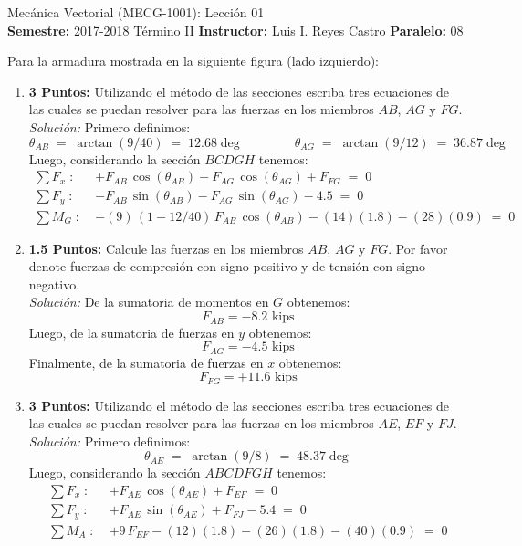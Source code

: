 \documentclass[ a4paper, twoside, 11pt]{article}
\newcommand{\numero}{01}
\begin{document}
\allowdisplaybreaks

\begin{center}
\Large Mec\'anica Vectorial (MECG-1001): Lecci\'on \numero \\[2ex]
\small \textbf{Semestre:} 2017-2018 T\'ermino II \qquad
\textbf{Instructor:} Luis I. Reyes Castro \qquad
\textbf{Paralelo:} 08
\end{center}
\fullskip

\begin{problem}
Para la armadura mostrada en la siguiente figura (lado izquierdo):
\begin{enumerate}[label=\textbf{\alph*)}]
\item \textbf{3 Puntos:} Utilizando el m\'etodo de las secciones escriba tres ecuaciones de las cuales se puedan resolver para las fuerzas en los miembros $AB$, $AG$ y $FG$. \\[1ex] \emph{Soluci\'on:} Primero definimos: 
\[
\theta_{AB} \; = \; \arctan( 9 / 40 ) \; = \; 12.68\deg \qquad \qquad
\theta_{AG} \; = \; \arctan( 9 / 12 ) \; = \; 36.87\deg
\]
Luego, considerando la secci\'on $BCDGH$ tenemos: 
\begin{align*}
\sum F_x \; \colon \;
& +F_{AB} \, \cos(\theta_{AB}) + F_{AG} \, \cos(\theta_{AG}) + F_{FG} \; = \; 0 \\[1ex]
\sum F_y \; \colon \;
& -F_{AB} \, \sin(\theta_{AB}) - F_{AG} \, \sin(\theta_{AG}) - 4.5 \; = \; 0 \\[1ex]
\sum M_G \; \colon \;
& - (9) \, ( 1 - 12/40 ) \, F_{AB} \, \cos(\theta_{AB}) - (14)(1.8) - (28)(0.9) \; = \; 0
\end{align*}

\item \textbf{1.5 Puntos:} Calcule las fuerzas en los miembros $AB$, $AG$ y $FG$. Por favor denote fuerzas de compresi\'on con signo positivo y de tensi\'on con signo negativo. \\[1ex] \emph{Soluci\'on:} De la sumatoria de momentos en $G$ obtenemos:
\[
F_{AB} = -8.2 \text{ kips}
\]
Luego, de la sumatoria de fuerzas en $y$ obtenemos: 
\[
F_{AG} = -4.5 \text{ kips}
\]
Finalmente, de la sumatoria de fuerzas en $x$ obtenemos: 
\[
F_{FG} = +11.6 \text{ kips}
\]

\item \textbf{3 Puntos:} Utilizando el m\'etodo de las secciones escriba tres ecuaciones de las cuales se puedan resolver para las fuerzas en los miembros $AE$, $EF$ y $FJ$. \\[1ex] \emph{Soluci\'on:} Primero definimos: 
\[
\theta_{AE} \; = \; \arctan( 9 / 8 ) \; = \; 48.37\deg
\]
Luego, considerando la secci\'on $ABCDFGH$ tenemos: 
\begin{align*}
\sum F_x \; \colon \;
& +F_{AE} \, \cos(\theta_{AE}) + F_{EF} \; = \; 0 \\[1ex]
\sum F_y \; \colon \;
& +F_{AE} \, \sin(\theta_{AE}) + F_{FJ} - 5.4 \; = \; 0 \\[1ex]
\sum M_A \; \colon \;
& +9 \, F_{EF} - (12)(1.8) - (26)(1.8) - (40)(0.9) \; = \; 0
\end{align*}


\end{enumerate}
\end{problem}
\end{document}
